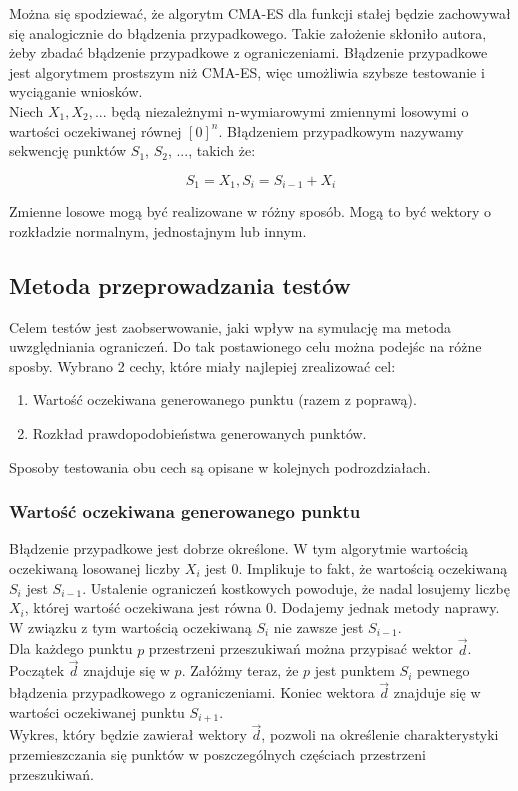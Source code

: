 \documentclass{mini}
\begin{document}
Można się spodziewać, że algorytm CMA-ES dla funkcji stałej będzie zachowywał się analogicznie do błądzenia przypadkowego. Takie założenie skłoniło autora, żeby zbadać błądzenie przypadkowe z ograniczeniami. Błądzenie przypadkowe jest algorytmem prostszym niż CMA-ES, więc umożliwia szybsze testowanie i wyciąganie wniosków.\\
Niech $ X_1, X_2, ... $ będą niezależnymi n-wymiarowymi zmiennymi losowymi o wartości oczekiwanej równej $ [0]^n $. Błądzeniem przypadkowym nazywamy sekwencję punktów $S_1$, $S_2$, ..., takich że:

\begin{equation}
S_1 = X_1, S_i=S_{i-1}+X_i
\end{equation}

Zmienne losowe mogą być realizowane w różny sposób. Mogą to być wektory o rozkładzie normalnym, jednostajnym lub innym.

\subsection{Metoda przeprowadzania testów}
Celem testów jest zaobserwowanie, jaki wpływ na symulację ma metoda uwzględniania ograniczeń. Do tak postawionego celu można podejśc na różne sposby. Wybrano 2 cechy, które miały najlepiej zrealizować cel:
\begin{enumerate}
\item Wartość oczekiwana generowanego punktu (razem z poprawą).
\item Rozkład prawdopodobieństwa generowanych punktów.
\end{enumerate}

Sposoby testowania obu cech są opisane w kolejnych podrozdziałach.

\subsubsection{Wartość oczekiwana generowanego punktu}
Błądzenie przypadkowe jest dobrze określone. W tym algorytmie wartością oczekiwaną losowanej liczby $X_i$ jest 0. Implikuje to fakt, że wartością oczekiwaną $S_i$ jest $S_{i-1}$. Ustalenie ograniczeń kostkowych powoduje, że nadal losujemy liczbę $X_i$, której wartość oczekiwana jest równa 0. Dodajemy jednak metody naprawy. W związku z tym wartością oczekiwaną $S_i$ nie zawsze jest $S_{i-1}$.\\
Dla każdego punktu $p$ przestrzeni przeszukiwań można przypisać wektor $\overrightarrow{d}$. Początek $\overrightarrow{d}$ znajduje się w $p$. Załóżmy teraz, że $p$ jest punktem $S_i$ pewnego błądzenia przypadkowego z ograniczeniami. Koniec wektora $\overrightarrow{d}$ znajduje się w wartości oczekiwanej punktu $S_{i+1}$.\\
Wykres, który będzie zawierał wektory $\overrightarrow{d}$, pozwoli na określenie charakterystyki przemieszczania się punktów w poszczególnych częściach przestrzeni przeszukiwań.\\
\end{document}
